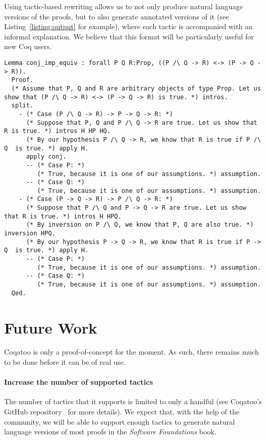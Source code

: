 \documentclass[sigplan,9pt]{acmart}\settopmatter{printfolios=true,printccs=false,printacmref=false}
\begin{document}
Using tactic-based rewriting allows us to not only produce natural language versions of the proofs, but to also generate annotated versions of it (see Listing~\ref{listing:output} for example), where each tactic is accompanied with an informal explanation. We believe that this format will be particularly useful for new Coq users.

\begin{figure*}
\begin{lstlisting}[label=listing:output, captionpos=b, caption={Output}]
  Lemma conj_imp_equiv : forall P Q R:Prop, ((P /\ Q -> R) <-> (P -> Q -> R)).
  Proof.
  (* Assume that P, Q and R are arbitrary objects of type Prop. Let us show that (P /\ Q -> R) <-> (P -> Q -> R) is true. *) intros.
  split.
    - (* Case (P /\ Q -> R) -> P -> Q -> R: *) 
      (* Suppose that P, Q and P /\ Q -> R are true. Let us show that R is true. *) intros H HP HQ.
      (* By our hypothesis P /\ Q -> R, we know that R is true if P /\ Q  is true. *) apply H.
      apply conj.
      -- (* Case P: *)
         (* True, because it is one of our assumptions. *) assumption.
      -- (* Case Q: *)
         (* True, because it is one of our assumptions. *) assumption.
    - (* Case (P -> Q -> R) -> P /\ Q -> R: *)
      (* Suppose that P /\ Q and P -> Q -> R are true. Let us show that R is true. *) intros H HPQ.
      (* By inversion on P /\ Q, we know that P, Q are also true. *) inversion HPQ.
      (* By our hypothesis P -> Q -> R, we know that R is true if P -> Q  is true. *) apply H.
      -- (* Case P: *)
         (* True, because it is one of our assumptions. *) assumption.
      -- (* Case Q: *)
         (* True, because it is one of our assumptions. *) assumption.
  Qed.
\end{lstlisting}
\end{figure*}



\pagebreak
\section{Future Work}
Coqatoo is only a proof-of-concept for the moment. As such, there remains much to be done before it can be of real use. 

\paragraph{Increase the number of supported tactics}
The number of tactics that it supports is limited to only a handful (see Coqatoo's GitHub repository~\cite{Coqatoo} for more details). We expect that, with the help of the community, we will be able to support enough tactics to generate natural language versions of most proofs in the \emph{Software Foundations} book.
\end{document}
